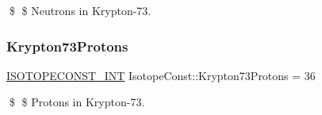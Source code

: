 \$ \$ Neutrons in Krypton-\/73. \mbox{\label{group___isotope_const-_krypton-_kr73_ga07c4ca76f2073e74b6b08bdc3ed93ab3}} 
\subsubsection{\texorpdfstring{Krypton73\+Protons}{Krypton73Protons}}
{\footnotesize\ttfamily \mbox{\hyperlink{group___isotope_const-_macros_ga5f18360b3e99483a35c32d789e62621c}{I\+S\+O\+T\+O\+P\+E\+C\+O\+N\+S\+T\+\_\+\+I\+NT}} Isotope\+Const\+::\+Krypton73\+Protons = 36}

\$ \$ Protons in Krypton-\/73. 